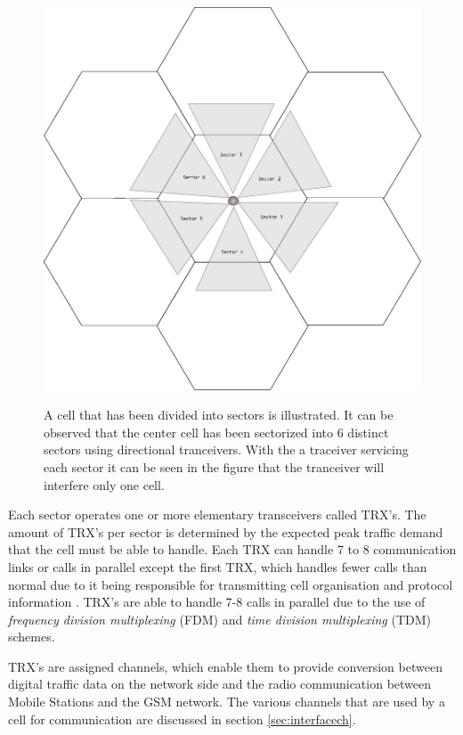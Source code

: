 \begin{figure}[t!]
	\begin{centering}
	\includegraphics[scale=0.75]{tikz-pics/cellsector.pdf}
	\label{fig:cellsector}
	\caption[Cell Sectorization]{A cell that has been divided into sectors is illustrated. It can be observed that the center cell has been sectorized into 6 distinct sectors using directional tranceivers. With the a traceiver servicing each sector it can be seen in the figure that the tranceiver will interfere only one cell.}
	\end{centering}
\end{figure}

Each sector operates one or more elementary transceivers called TRX’s. The amount of TRX’s per sector is determined by the expected peak traffic demand that the cell must be able to handle. Each TRX can handle 7 to 8 communication links or calls in parallel except the first TRX, which handles fewer calls than normal due to it being responsible for transmitting cell organisation and protocol information \cite{Eisenblatter}. TRX’s are able to handle 7-8 calls in parallel due to the use of \emph{frequency division multiplexing} (FDM) and \emph{time division multiplexing} (TDM) schemes. 

TRX’s are assigned channels, which enable them to provide conversion between digital traffic data on the network side and the radio communication between Mobile Stations and the GSM network\cite{ACOvsEA,FAPOrientationModel}. The various channels that are used by a cell for communication are discussed in section \ref{sec:interfacech}.

